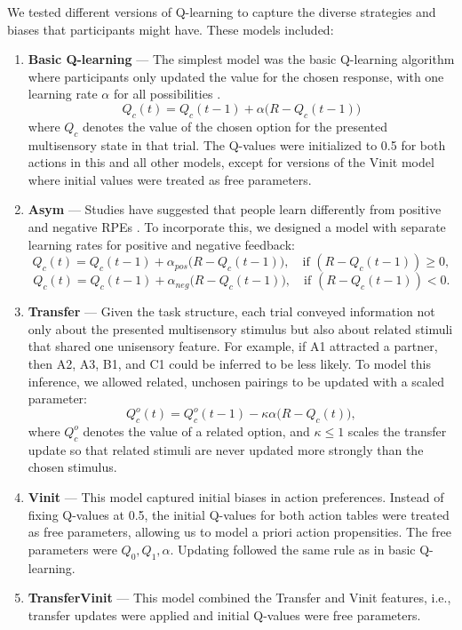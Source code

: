 \documentclass{article}
\begin{document}
We tested different versions of Q-learning to capture the diverse strategies and biases that participants might have. These models included:
\begin{enumerate}
    \item \textbf{Basic Q-learning} — 
    The simplest model was the basic Q-learning algorithm where participants only updated the value for the chosen response, with one learning rate $\alpha$ for all possibilities \cite{rescorla1972theory, sutton2018reinforcement}.
    \[
    Q_c(t) = Q_c(t-1) + \alpha \big(R - Q_c(t-1)\big)
    \]
    where $Q_c$ denotes the value of the chosen option for the presented multisensory state in that trial. The Q-values were initialized to 0.5 for both actions in this and all other models, except for versions of the Vinit model where initial values were treated as free parameters.
    
    \item \textbf{Asym} — 
    Studies have suggested that people learn differently from positive and negative RPEs \cite{daw2002opponent, frank2007genetic, lefebvre2017behavioural, gershman2015learning}. To incorporate this, we designed a model with separate learning rates for positive and negative feedback:
    \[
    Q_c(t) = Q_c(t-1) + \alpha_{pos} \big(R - Q_c(t-1)\big), \quad \text{if } (R - Q_c(t-1)) \geq 0,
    \]
    \[
    Q_c(t) = Q_c(t-1) + \alpha_{neg} \big(R - Q_c(t-1)\big), \quad \text{if } (R - Q_c(t-1)) < 0.
    \]

    \item \textbf{Transfer} — 
    Given the task structure, each trial conveyed information not only about the presented multisensory stimulus but also about related stimuli that shared one unisensory feature. For example, if A1 attracted a partner, then A2, A3, B1, and C1 could be inferred to be less likely. To model this inference, we allowed related, unchosen pairings to be updated with a scaled parameter:
    \[
    Q_c^o(t) = Q_c^o(t-1) - \kappa \alpha \big(R - Q_c(t)\big),
    \]
    where $Q_c^o$ denotes the value of a related option, and $\kappa \leq 1$ scales the transfer update so that related stimuli are never updated more strongly than the chosen stimulus.

    \item \textbf{Vinit} —  
    This model captured initial biases in action preferences. Instead of fixing Q-values at 0.5, the initial Q-values for both action tables were treated as free parameters, allowing us to model a priori action propensities. The free parameters were $Q_0, Q_1, \alpha$. Updating followed the same rule as in basic Q-learning.

    \item \textbf{TransferVinit} —  
    This model combined the Transfer and Vinit features, i.e., transfer updates were applied and initial Q-values were free parameters.
\end{enumerate}
\end{document}
